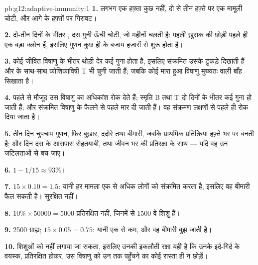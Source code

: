 \begin{solution}{pb:g12:adaptive-immunity:1}
\textbf{1.} लगभग एक हफ़्ता कुछ नहीं, दो से तीन हफ़्ते पर एक मामूली चोटी, और
आगे के हफ़्तों पर गिरावट।

\textbf{2.} दो-तीन दिनों के भीतर , दस गुनी ऊँची चोटी, जो महीनों
चलती है: पहली ख़ुराक की छोड़ी  पहले ही एक बड़ा क्लोन हैं,
इसलिए गुणन कुछ ही  के बजाय हज़ारों  से शुरू होता है।

\textbf{3.} कोई जीवित विषाणु  के भीतर थोड़ी देर कई गुना होता है,
इसलिए संक्रमित  उसके टुकड़े दिखाती हैं और  के साथ-साथ
कोशिकाविषी T  भी चुनी जाती हैं; जबकि कोई मारा हुआ विषाणु मुख्यतः
 वाली बाँह सिखाता है।

\textbf{4.} पहले से मौजूद  उस विषाणु का अधिकांश रोक देते हैं;
स्मृति B तथा T  दो दिनों के भीतर कई गुना हो जाती हैं; और संक्रमित
 विषाणु के फैलने से पहले मार दी जाती हैं। वह संक्रमण लक्षणों से पहले
ही रोक दिया जाता है।

\textbf{5.} तीन दिन चुपचाप गुणन, फिर बुख़ार, ददोरे तथा बीमारी, जबकि
प्राथमिक प्रतिक्रिया हफ़्ते भर पर बनती है; और दिन दस के आसपास सेहतयाबी,
 तथा जीवन भर की प्रतिरक्षा के साथ --- यदि वह उन जटिलताओं से
बच जाए।

\textbf{6.} $1 - 1/15 \approx 93\%$।

\textbf{7.} $15 \times 0.10 = 1.5$: यानी हर मामला एक से अधिक लोगों को
संक्रमित करता है, इसलिए वह बीमारी फैल सकती है। सुरक्षित नहीं।

\textbf{8.} $10\% \times \num{50000} = 5000$ प्रतिरक्षित नहीं, जिनमें से
1500 वे शिशु हैं।

\textbf{9.} 2500 ग्राह्य; $15 \times 0.05 = 0.75$: यानी एक से कम, और वह
बीमारी बुझ जाती है।

\textbf{10.} शिशुओं को  नहीं लगाया जा सकता, इसलिए उनकी इकलौती रक्षा यही
है कि उनके इर्द-गिर्द के वयस्क, प्रतिरक्षित होकर, उस विषाणु को उन तक
पहुँचने का कोई रास्ता ही न छोड़ें।


\end{solution}
